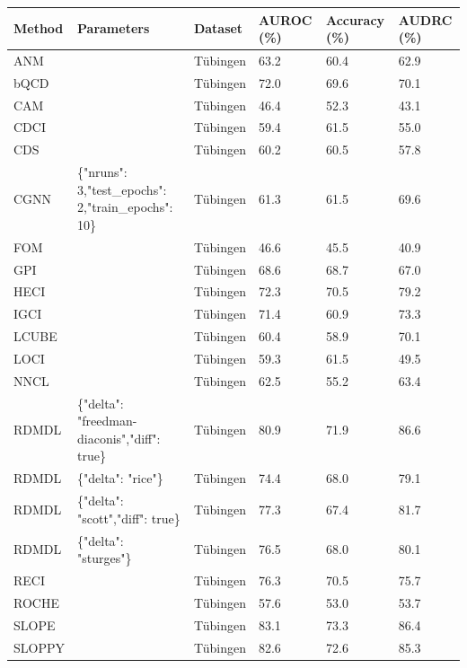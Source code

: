 \begin{tabular}{llllll}
\toprule
Method & Parameters & Dataset & AUROC (\%) & Accuracy (\%) & AUDRC (\%) \\
\midrule
ANM &  & Tübingen & 63.2 & 60.4 & 62.9 \\
bQCD &  & Tübingen & 72.0 & 69.6 & 70.1 \\
CAM &  & Tübingen & 46.4 & 52.3 & 43.1 \\
CDCI &  & Tübingen & 59.4 & 61.5 & 55.0 \\
CDS &  & Tübingen & 60.2 & 60.5 & 57.8 \\
CGNN & \{"nruns": 3,"test\_epochs": 2,"train\_epochs": 10\} & Tübingen & 61.3 & 61.5 & 69.6 \\
FOM &  & Tübingen & 46.6 & 45.5 & 40.9 \\
GPI &  & Tübingen & 68.6 & 68.7 & 67.0 \\
HECI &  & Tübingen & 72.3 & 70.5 & 79.2 \\
IGCI &  & Tübingen & 71.4 & 60.9 & 73.3 \\
LCUBE &  & Tübingen & 60.4 & 58.9 & 70.1 \\
LOCI &  & Tübingen & 59.3 & 61.5 & 49.5 \\
NNCL &  & Tübingen & 62.5 & 55.2 & 63.4 \\
RDMDL & \{"delta": "freedman-diaconis","diff": true\} & Tübingen & 80.9 & 71.9 & 86.6 \\
RDMDL & \{"delta": "rice"\} & Tübingen & 74.4 & 68.0 & 79.1 \\
RDMDL & \{"delta": "scott","diff": true\} & Tübingen & 77.3 & 67.4 & 81.7 \\
RDMDL & \{"delta": "sturges"\} & Tübingen & 76.5 & 68.0 & 80.1 \\
RECI &  & Tübingen & 76.3 & 70.5 & 75.7 \\
ROCHE &  & Tübingen & 57.6 & 53.0 & 53.7 \\
SLOPE &  & Tübingen & 83.1 & 73.3 & 86.4 \\
SLOPPY &  & Tübingen & 82.6 & 72.6 & 85.3 \\
\bottomrule
\end{tabular}
